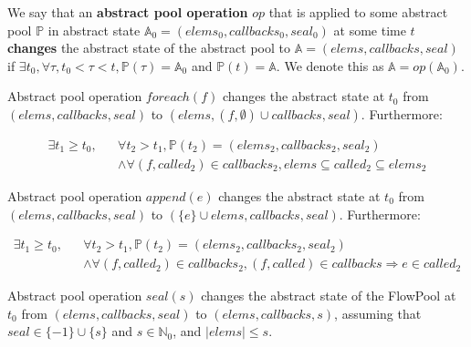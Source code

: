 \documentclass[runningheads,a4paper]{llncs}
\begin{document}
\begin{definition}
We say that an \textbf{abstract pool operation} $op$ that is applied to some
abstract pool $\mathbb{P}$ in abstract state $\mathbb{A}_0 = (elems_0, callbacks_0, seal_0)$ 
at some time $t$ \textbf{changes} the abstract state of the abstract
pool to $\mathbb{A} = (elems, callbacks, seal)$ if $\exists t_0,
\forall \tau, t_0 < \tau < t, \mathbb{P}(\tau) = \mathbb{A}_0$ 
and $\mathbb{P}(t) = \mathbb{A}$.
We denote this as $\mathbb{A} = op(\mathbb{A}_0)$.

Abstract pool operation $foreach(f)$ changes the abstract state at $t_0$ from $(elems, callbacks, seal)$ 
to $(elems, (f, \emptyset) \cup callbacks, seal)$. Furthermore:

\begin{eqnarray*}
\exists t_1 \geq t_0, & & \forall t_2 > t_1, \mathbb{P}(t_2) = (elems_2,
callbacks_2, seal_2) \\
& & \wedge \forall (f, called_2) \in callbacks_2, elems \subseteq
called_2 \subseteq elems_2
\end{eqnarray*}

Abstract pool operation $append(e)$ changes the abstract state at $t_0$ from
$(elems, callbacks, seal)$ to $(\{e\} \cup elems, callbacks, seal)$. Furthermore:

\begin{eqnarray*}
\exists t_1 \geq t_0, & & \forall t_2 > t_1, \mathbb{P}(t_2) = (elems_2,
callbacks_2, seal_2) \\
& & \wedge \forall (f, called_2) \in callbacks_2, (f, called) \in
callbacks \Rightarrow e \in called_2
\end{eqnarray*}

Abstract pool operation $seal(s)$ changes the abstract state of the
FlowPool at $t_0$ from $(elems, callbacks, seal)$ to $(elems,
callbacks, s)$, assuming that $seal \in \{-1\} \cup \{s\}$ and $s \in
\mathbb{N}_0$, and $|elems| \leq s$.
\end{definition}
\end{document}
